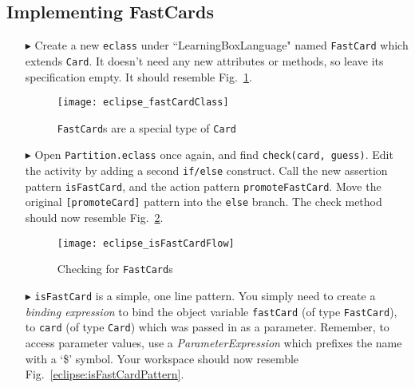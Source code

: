 \newpage
\subsection{Implementing FastCards}
\texHeader
\hypertarget{fastCard tex}{}

\begin{itemize}
  
\item[$\blacktriangleright$] Create a new \texttt{eclass} under ``LearningBoxLanguage" named \texttt{FastCard} which extends \texttt{Card}. It doesn't need any
new attributes or methods, so leave its specification empty. It should resemble Fig.~\ref{eclipse:fastClass}.

\vspace{0.5cm}

\begin{figure}[htp] 
\begin{center}
  \texttt{[image: eclipse\_fastCardClass]}
  \caption{\texttt{FastCard}s are a special type of \texttt{Card}}
  \label{eclipse:fastClass}
\end{center}
\end{figure}

\item[$\blacktriangleright$] Open \texttt{Partition.eclass} once again, and find \texttt{check(card, guess)}. Edit the activity by adding a second
\texttt{if/else} construct. Call the new assertion pattern \texttt{isFastCard}, and the action pattern \texttt{promoteFastCard}. Move the original
\texttt{[promoteCard]} pattern into the \texttt{else} branch. The check method should now resemble Fig.~\ref{eclipse:isFastCard}.

\vspace{0.5cm}

\begin{figure}[htp]
\begin{center}
  \texttt{[image: eclipse\_isFastCardFlow]}
  \caption{Checking for \texttt{FastCard}s}
  \label{eclipse:isFastCard}
\end{center}
\end{figure}

\item[$\blacktriangleright$] \texttt{isFastCard} is a simple, one line pattern. You simply need to create a \emph{binding expression} to bind the
object variable \texttt{fastCard} (of type \texttt{FastCard}), to \texttt{card} (of type \texttt{Card}) which was passed in as a parameter. Remember, to access
parameter values, use a \emph{ParameterExpression} which prefixes the name with a `\$' symbol. Your workspace should now resemble
Fig.~\ref{eclipse:isFastCardPattern}.


\end{itemize}
